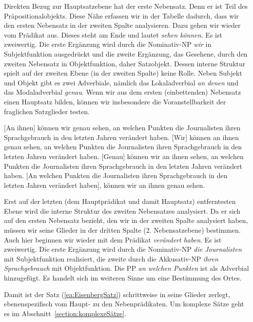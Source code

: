Direkten Bezug zur Hauptsatzebene hat der erste Nebensatz. Denn er ist Teil des Präpositionalobjekts. Diese Nähe erfassen wir in der Tabelle dadurch, dass wir den ersten Nebensatz in der zweiten Spalte analysieren. Dazu gehen wir wieder vom Prädikat aus. Dieses steht am Ende und lautet \textit{sehen können}. Es ist zweiwertig. Die erste Ergänzung wird durch die Nominativ-NP \textit{wir} in Subjektfunktion ausgedrückt und die zweite Ergänzung, das Gesehene, durch den zweiten Nebensatz in Objektfunktion, daher Satzobjekt. Dessen interne Struktur spielt auf der zweiten Ebene (in der zweiten Spalte) keine Rolle. Neben Subjekt und Objekt gibt es zwei Adverbiale, nämlich das Lokaladverbial \textit{an denen} und das Modaladverbial \textit{genau}. Wenn wir aus dem ersten (einbettenden) Nebensatz einen Hauptsatz bilden, können wir insbesondere die Voranstellbarkeit der fraglichen Satzglieder testen.

\ea \label{ea:NeSaSatzglied}
\ea \label{ea:PPTop} [An ihnen] können wir genau sehen, an welchen Punkten die Journalisten ihren Sprachgebrauch in den letzten Jahren verändert haben.
\ex \label{ex:SubjTop} [Wir] können an ihnen genau sehen, an welchen Punkten die Journalisten ihren Sprachgebrauch in den letzten Jahren verändert haben.
\ex \label{ex:AdvTop} [Genau] können wir an ihnen sehen, an welchen Punkten die Journalisten ihren Sprachgebrauch in den letzten Jahren verändert haben.
\ex \label{ex:NeSaTop} [An welchen Punkten die Journalisten ihren Sprachgebrauch in den letzten Jahren verändert haben], können wir an ihnen genau sehen.
\z 
\z 

Erst auf der letzten (dem Hauptprädikat und damit Hauptsatz) entferntesten Ebene wird die interne Struktur des zweiten Nebensatzes analysiert. Da er sich auf den ersten Nebensatz bezieht, den wir in der zweiten Spalte analysiert haben, müssen wir seine Glieder in der dritten Spalte (2. Nebensatzebene) bestimmen. Auch hier beginnen wir wieder mit dem Prädikat \textit{verändert haben}. Es ist zweiwertig. Die erste Ergänzung wird durch die Nominativ-NP \textit{die Journalisten} mit Subjektfunktion realisiert, die zweite durch die Akkusativ-NP \textit{ihren Sprachgebrauch} mit Objektfunktion. Die PP \textit{an welchen Punkten} ist als Adverbial hinzugefügt. Es handelt sich im weiteren Sinne um eine Bestimmung des Ortes.   


Damit ist der Satz (\ref{ea:EisenbergSatz}) schrittweise in seine Glieder zerlegt, ebenenspezifisch vom Haupt- zu den Nebenprädikaten. Um komplexe Sätze geht es im Abschnitt~\ref{section:komplexeSätze}. 

